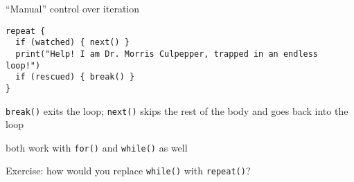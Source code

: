 \documentclass[8pt,ignorenonframetext,]{beamer}
\begin{document}
\begin{frame}[fragile]{``Manual'' control over iteration}

\begin{verbatim}
repeat {
  if (watched) { next() }
  print("Help! I am Dr. Morris Culpepper, trapped in an endless loop!")
  if (rescued) { break() }
}
\end{verbatim}

\texttt{break()} exits the loop; \texttt{next()} skips the rest of the
body and goes back into the loop

both work with \texttt{for()} and \texttt{while()} as well

Exercise: how would you replace \texttt{while()} with \texttt{repeat()}?

\end{frame}
\end{document}

